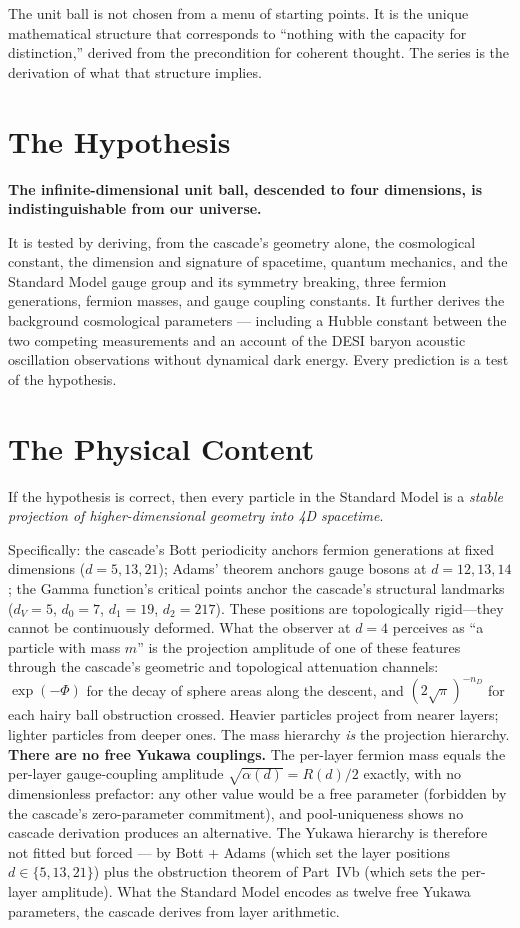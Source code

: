 \documentclass[12pt,a4paper]{article}
\begin{document}
The unit ball is not chosen from a menu of starting points. It is the unique
mathematical structure that corresponds to ``nothing with the capacity for
distinction,'' derived from the precondition for coherent thought. The series
is the derivation of what that structure implies.

\section*{The Hypothesis}

\begin{center}
\textbf{The infinite-dimensional unit ball, descended to four dimensions, is indistinguishable from our universe.}
\end{center}

It is tested by deriving, from the cascade's geometry alone, the cosmological
constant, the dimension and signature of spacetime, quantum mechanics, and the
Standard Model gauge group and its symmetry breaking, three fermion generations,
fermion masses, and gauge coupling constants. It further derives the background
cosmological parameters --- including a Hubble constant between the two competing
measurements and an account of the DESI baryon acoustic oscillation observations
without dynamical dark energy. Every prediction is a test of the hypothesis.

\section*{The Physical Content}

If the hypothesis is correct, then every particle in the Standard Model is a
\emph{stable projection of higher-dimensional geometry into 4D spacetime}.

Specifically: the cascade's Bott periodicity anchors fermion generations at
fixed dimensions ($d = 5, 13, 21$); Adams' theorem anchors gauge bosons at
$d = 12, 13, 14$; the Gamma function's critical points anchor the cascade's
structural landmarks ($d_V = 5$, $d_0 = 7$, $d_1 = 19$, $d_2 = 217$). These
positions are topologically rigid---they cannot be continuously deformed.
What the observer at $d = 4$ perceives as ``a particle with mass $m$'' is the
projection amplitude of one of these features through the cascade's geometric
and topological attenuation channels: $\exp(-\Phi)$ for the decay of sphere
areas along the descent, and $(2\sqrt{\pi})^{-n_D}$ for each hairy ball
obstruction crossed. Heavier particles project from nearer layers; lighter
particles from deeper ones. The mass hierarchy \emph{is} the projection hierarchy.
\textbf{There are no free Yukawa couplings.} The per-layer fermion mass equals
the per-layer gauge-coupling amplitude $\sqrt{\alpha(d)} = R(d)/2$ exactly,
with no dimensionless prefactor: any other value would be a free parameter
(forbidden by the cascade's zero-parameter commitment), and pool-uniqueness
shows no cascade derivation produces an alternative. The Yukawa hierarchy is
therefore not fitted but forced --- by Bott + Adams (which set the layer
positions $d \in \{5, 13, 21\}$) plus the obstruction theorem of Part~IVb
(which sets the per-layer amplitude). What the Standard Model encodes as
twelve free Yukawa parameters, the cascade derives from layer arithmetic.
\end{document}
